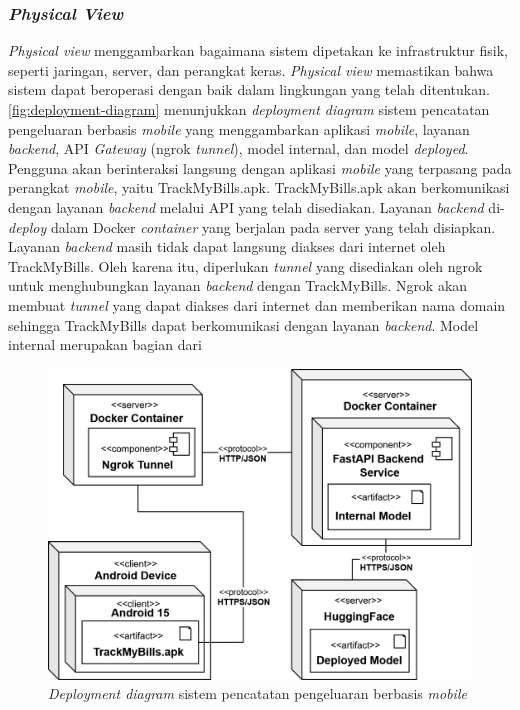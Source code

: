 \subsubsection{\emph{Physical View}}
\label{subsubsec:physical-view}
\emph{Physical view} menggambarkan bagaimana sistem dipetakan ke infrastruktur fisik, seperti jaringan, server, dan perangkat keras. \emph{Physical view} memastikan bahwa sistem dapat beroperasi dengan baik dalam lingkungan yang telah ditentukan. \autoref{fig:deployment-diagram} menunjukkan \emph{deployment diagram} sistem pencatatan pengeluaran berbasis \emph{mobile} yang menggambarkan aplikasi \emph{mobile}, layanan \emph{backend}, API \emph{Gateway} (ngrok \emph{tunnel}), model internal, dan model \emph{deployed}. Pengguna akan berinteraksi langsung dengan aplikasi \emph{mobile} yang terpasang pada perangkat \emph{mobile}, yaitu TrackMyBills.apk. TrackMyBills.apk akan berkomunikasi dengan layanan \emph{backend} melalui API yang telah disediakan. Layanan \emph{backend} di-\emph{deploy} dalam Docker \emph{container} yang berjalan pada server yang telah disiapkan. Layanan \emph{backend} masih tidak dapat langsung diakses dari internet oleh TrackMyBills. Oleh karena itu, diperlukan \emph{tunnel} yang disediakan oleh ngrok untuk menghubungkan layanan \emph{backend} dengan TrackMyBills. Ngrok akan membuat \emph{tunnel} yang dapat diakses dari internet dan memberikan nama domain sehingga TrackMyBills dapat berkomunikasi dengan layanan \emph{backend}. Model internal merupakan bagian dari 
\begin{figure}[htbp]
    \centering
    \includegraphics[width=1\textwidth]{images/deployment-diagram.png}
    \caption{\emph{Deployment diagram} sistem pencatatan pengeluaran berbasis \emph{mobile}}
    \label{fig:deployment-diagram}
\end{figure}